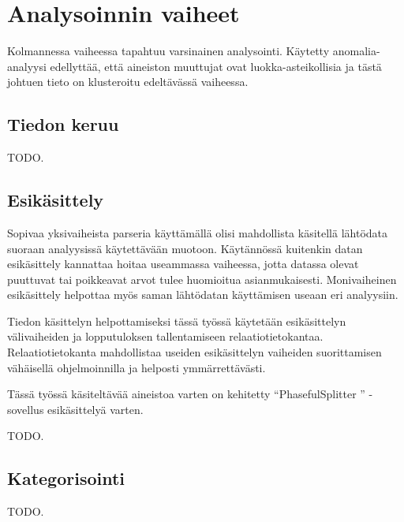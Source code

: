\section{Analysoinnin vaiheet}

Kolmannessa vaiheessa tapahtuu varsinainen analysointi. Käytetty
anomalia-analyysi edellyttää, että aineiston muuttujat ovat
luokka-asteikollisia ja tästä johtuen tieto on klusteroitu edeltävässä vaiheessa.

\subsection{Tiedon keruu}

TODO.

\subsection{Esikäsittely}

Sopivaa yksivaiheista parseria käyttämällä olisi mahdollista käsitellä
lähtödata suoraan analyysissä käytettävään muotoon. Käytännössä kuitenkin datan
esikäsittely kannattaa hoitaa useammassa vaiheessa, jotta datassa
olevat puuttuvat tai poikkeavat arvot tulee huomioitua
asianmukaisesti. Monivaiheinen esikäsittely helpottaa myös saman
lähtödatan käyttämisen useaan eri analyysiin.

Tiedon käsittelyn helpottamiseksi tässä työssä käytetään esikäsittelyn
välivaiheiden ja lopputuloksen tallentamiseen
relaatiotietokantaa. Relaatiotietokanta mahdollistaa useiden
esikäsittelyn vaiheiden suorittamisen vähäisellä ohjelmoinnilla ja
helposti ymmärrettävästi.

Tässä työssä käsiteltävää aineistoa varten on kehitetty ``PhasefulSplitter
'' -sovellus esikäsittelyä varten.

TODO.

\subsection{Kategorisointi}

TODO.
